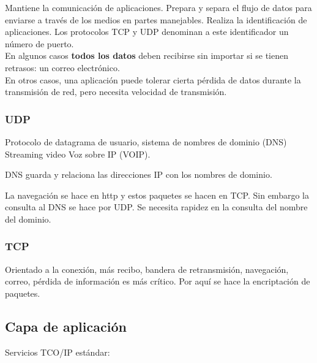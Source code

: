 Mantiene la comunicación de aplicaciones. Prepara y separa el flujo de datos para enviarse a través de los medios en partes manejables.
Realiza la identificación de aplicaciones. Los protocolos TCP y UDP denominan a este identificador un número de puerto.\\

En algunos casos \textbf{todos los datos} deben recibirse sin importar si se tienen retrasos: un correo electrónico.\\

En otros casos, una aplicación puede tolerar cierta pérdida de datos durante la transmisión de red, pero necesita velocidad de transmisión.\\

\subsubsection{UDP}

Protocolo de datagrama de usuario, sistema de nombres de dominio (DNS) Streaming video Voz sobre IP (VOIP).

DNS guarda y relaciona las direcciones IP con los nombres de dominio. 

La navegación se hace en http y estos paquetes se hacen en TCP. Sin embargo la consulta al DNS se hace por UDP. Se necesita rapidez en la consulta del nombre del dominio.

\subsubsection{TCP}

Orientado a la conexión, más recibo, bandera de retransmisión, navegación, correo, pérdida de información es más crítico. Por aquí se hace la encriptación de paquetes. 

\subsection{Capa de aplicación}

Servicios TCO/IP estándar:

